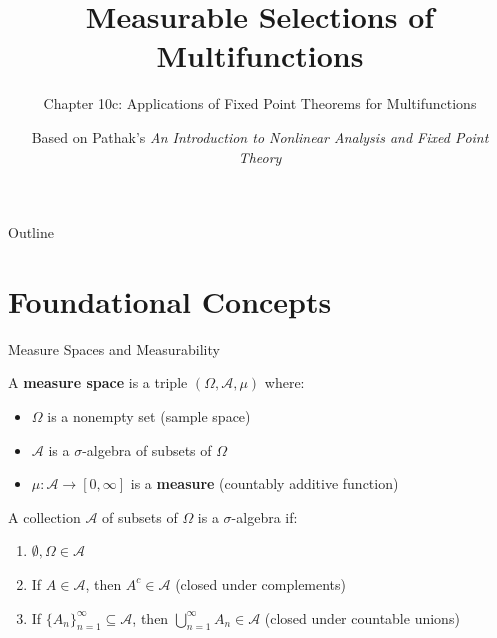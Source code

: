 \documentclass[aspectratio=169,10pt]{beamer}
\title{Measurable Selections of Multifunctions}
\subtitle{Chapter 10c: Applications of Fixed Point Theorems for Multifunctions}
\author{Based on Pathak's \textit{An Introduction to Nonlinear Analysis and Fixed Point Theory}}
\date{}
\institute{}
\begin{document}
\begin{frame}
\titlepage
\end{frame}

\begin{frame}{Outline}
\tableofcontents
\end{frame}

\section{Foundational Concepts}

\begin{frame}{Measure Spaces and Measurability}
\begin{definition}
A \textbf{measure space} is a triple $(\Omega, \mathcal{A}, \mu)$ where:
\begin{itemize}
    \item $\Omega$ is a nonempty set (sample space)
    \item $\mathcal{A}$ is a $\sigma$-algebra of subsets of $\Omega$
    \item $\mu: \mathcal{A} \to [0, \infty]$ is a \textbf{measure} (countably additive function)
\end{itemize}
\end{definition}

\vspace{0.3cm}

\begin{definition}
A collection $\mathcal{A}$ of subsets of $\Omega$ is a $\sigma$-algebra if:
\begin{enumerate}
    \item $\emptyset, \Omega \in \mathcal{A}$
    \item If $A \in \mathcal{A}$, then $A^c \in \mathcal{A}$ (closed under complements)
    \item If $\{A_n\}_{n=1}^{\infty} \subseteq \mathcal{A}$, then $\bigcup_{n=1}^{\infty} A_n \in \mathcal{A}$ (closed under countable unions)
\end{enumerate}
\end{definition}
\end{frame}
\end{document}
